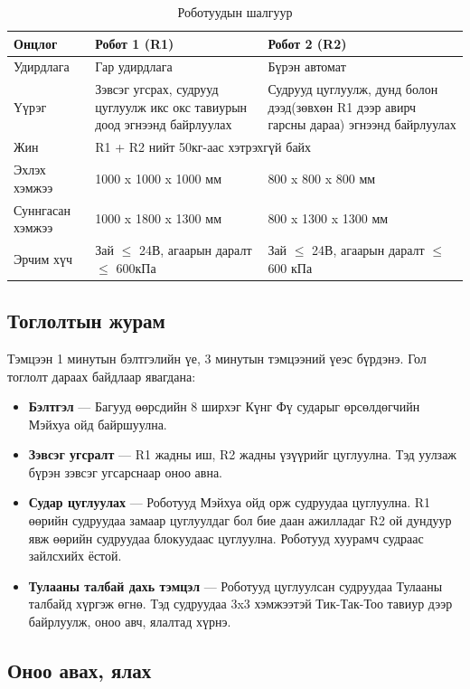 \begin{table}[h]
	\centering
	\begin{tabular}{|p{3cm}|p{5cm}|p{5cm}|}
		\hline Онцлог & Робот 1 (R1) & Робот 2 (R2) \\
		\hline Удирдлага & Гар удирдлага & Бүрэн автомат \\
		\hline Үүрэг & Зэвсэг угсрах, судрууд цуглуулж икс окс тавиурын доод эгнээнд байрлуулах & Судрууд цуглуулж, дунд болон дээд(зөвхөн R1 дээр авирч гарсны дараа) эгнээнд байрлуулах \\
		\hline Жин & \multicolumn{2}{l|}{R1 + R2 нийт 50кг-аас хэтрэхгүй байх} \\
		\hline Эхлэх хэмжээ & 1000 x 1000 x 1000 мм & 800 x 800 x 800 мм \\
		\hline Суннгасан хэмжээ & 1000 x 1800 x 1300 мм & 800 x 1300 x 1300 мм \\
		\hline Эрчим хүч & Зай $\le$ 24В, агаарын даралт $\le$ 600кПа & Зай $\le$ 24В, агаарын даралт $\le$ 600 кПа \\
		\hline
	\end{tabular}
	\caption{Роботуудын шалгуур}
	\label{table:robot-requirements}
\end{table}

\subsection{Тоглолтын журам}

Тэмцээн 1 минутын бэлтгэлийн үе, 3 минутын тэмцээний үеэс бүрдэнэ. Гол тоглолт дараах байдлаар явагдана:
\begin{itemize}
	\item \textbf{Бэлтгэл} --- Багууд өөрсдийн 8 ширхэг Күнг Фү сударыг өрсөлдөгчийн Мэйхуа ойд байршуулна.
	\item \textbf{Зэвсэг угсралт} --- R1 жадны иш, R2 жадны үзүүрийг цуглуулна. Тэд уулзаж бүрэн зэвсэг угсарснаар оноо авна.
	\item \textbf{Судар цуглуулах} --- Роботууд Мэйхуа ойд орж судруудаа цуглуулна. R1 өөрийн судруудаа замаар цуглуулдаг бол бие даан ажилладаг R2 ой дундуур явж өөрийн судруудаа блокуудаас цуглуулна. Роботууд хуурамч судраас зайлсхийх ёстой.
	\item \textbf{Тулааны талбай дахь тэмцэл} --- Роботууд цуглуулсан судруудаа Тулааны талбайд хүргэж өгнө. Тэд судруудаа 3x3 хэмжээтэй Тик-Так-Тоо тавиур дээр байрлуулж, оноо авч, ялалтад хүрнэ.
\end{itemize}

\subsection{Оноо авах, ялах}

